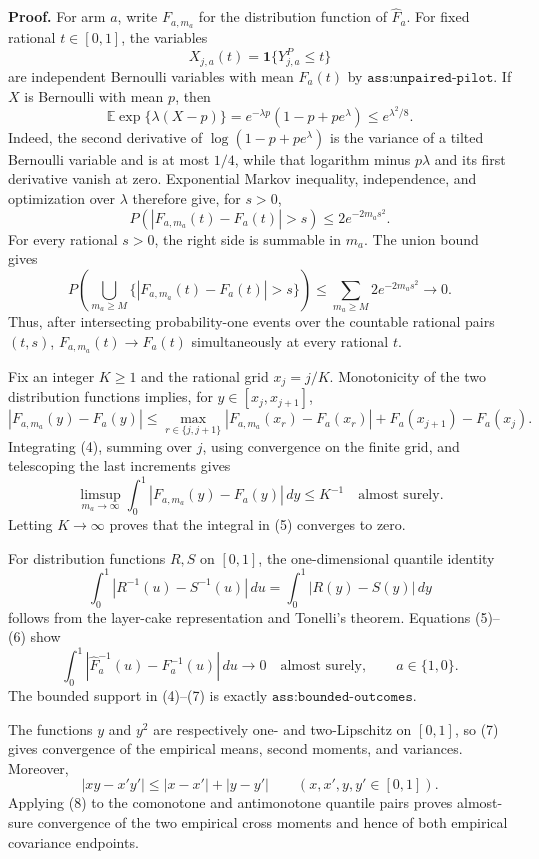 \textbf{Proof.}
For arm \(a\), write \(F_{a,m_a}\) for the distribution function of \(\widehat F_a\).  For fixed rational \(t\in[0,1]\), the variables
\[
X_{j,a}(t)=\mathbf 1\{Y^P_{j,a}\le t\}
\]
are independent Bernoulli variables with mean \(F_a(t)\) by \(\texttt{ass:unpaired-pilot}\).  If \(X\) is Bernoulli with mean \(p\), then
\[
\mathbb E\exp\{\lambda(X-p)\}
=e^{-\lambda p}(1-p+pe^\lambda)\le e^{\lambda^2/8}.
\tag{1}
\]
Indeed, the second derivative of \(\log(1-p+pe^\lambda)\) is the variance of a tilted Bernoulli variable and is at most \(1/4\), while that logarithm minus \(p\lambda\) and its first derivative vanish at zero.  Exponential Markov inequality, independence, and optimization over \(\lambda\) therefore give, for \(s>0\),
\[
P\!\left(\left|F_{a,m_a}(t)-F_a(t)\right|>s\right)
\le2e^{-2m_as^2}.
\tag{2}
\]
For every rational \(s>0\), the right side is summable in \(m_a\).  The union bound gives
\[
P\!\left(\bigcup_{m_a\ge M}
\{|F_{a,m_a}(t)-F_a(t)|>s\}\right)
\le\sum_{m_a\ge M}2e^{-2m_as^2}\longrightarrow0.
\tag{3}
\]
Thus, after intersecting probability-one events over the countable rational pairs \((t,s)\), \(F_{a,m_a}(t)\to F_a(t)\) simultaneously at every rational \(t\).

Fix an integer \(K\ge1\) and the rational grid \(x_j=j/K\).  Monotonicity of the two distribution functions implies, for \(y\in[x_j,x_{j+1}]\),
\[
|F_{a,m_a}(y)-F_a(y)|
\le
\max_{r\in\{j,j+1\}}|F_{a,m_a}(x_r)-F_a(x_r)|
+F_a(x_{j+1})-F_a(x_j).
\tag{4}
\]
Integrating (4), summing over \(j\), using convergence on the finite grid, and telescoping the last increments gives
\[
\limsup_{m_a\to\infty}
\int_0^1|F_{a,m_a}(y)-F_a(y)|\,dy\le K^{-1}
\quad\text{almost surely}.
\tag{5}
\]
Letting \(K\to\infty\) proves that the integral in (5) converges to zero.

For distribution functions \(R,S\) on \([0,1]\), the one-dimensional quantile identity
\[
\int_0^1|R^{-1}(u)-S^{-1}(u)|\,du
=\int_0^1|R(y)-S(y)|\,dy
\tag{6}
\]
follows from the layer-cake representation and Tonelli's theorem.  Equations (5)--(6) show
\[
\int_0^1|\widehat F_a^{-1}(u)-F_a^{-1}(u)|\,du
\longrightarrow0
\quad\text{almost surely},
\qquad a\in\{1,0\}.
\tag{7}
\]
The bounded support in (4)--(7) is exactly \(\texttt{ass:bounded-outcomes}\).

The functions \(y\) and \(y^2\) are respectively one- and two-Lipschitz on \([0,1]\), so (7) gives convergence of the empirical means, second moments, and variances.  Moreover,
\[
|xy-x'y'|\le|x-x'|+|y-y'|
\qquad(x,x',y,y'\in[0,1]).
\tag{8}
\]
Applying (8) to the comonotone and antimonotone quantile pairs proves almost-sure convergence of the two empirical cross moments and hence of both empirical covariance endpoints.

